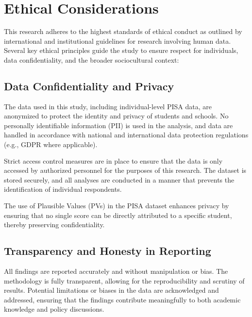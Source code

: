 \documentclass[
]{article}
\begin{document}
\hypertarget{ethical-considerations}{%
\section{Ethical Considerations}\label{ethical-considerations}}

This research adheres to the highest standards of ethical conduct as
outlined by international and institutional guidelines for research
involving human data. Several key ethical principles guide the study to
ensure respect for individuals, data confidentiality, and the broader
sociocultural context:

\hypertarget{data-confidentiality-and-privacy}{%
\subsection{Data Confidentiality and
Privacy}\label{data-confidentiality-and-privacy}}

The data used in this study, including individual-level PISA data, are
anonymized to protect the identity and privacy of students and schools.
No personally identifiable information (PII) is used in the analysis,
and data are handled in accordance with national and international data
protection regulations (e.g., GDPR where applicable).

Strict access control measures are in place to ensure that the data is
only accessed by authorized personnel for the purposes of this research.
The dataset is stored securely, and all analyses are conducted in a
manner that prevents the identification of individual respondents.

The use of Plausible Values (PVs) in the PISA dataset enhances privacy
by ensuring that no single score can be directly attributed to a
specific student, thereby preserving confidentiality.

\hypertarget{transparency-and-honesty-in-reporting}{%
\subsection{Transparency and Honesty in
Reporting}\label{transparency-and-honesty-in-reporting}}

All findings are reported accurately and without manipulation or bias.
The methodology is fully transparent, allowing for the reproducibility
and scrutiny of results. Potential limitations or biases in the data are
acknowledged and addressed, ensuring that the findings contribute
meaningfully to both academic knowledge and policy discussions.
\end{document}
